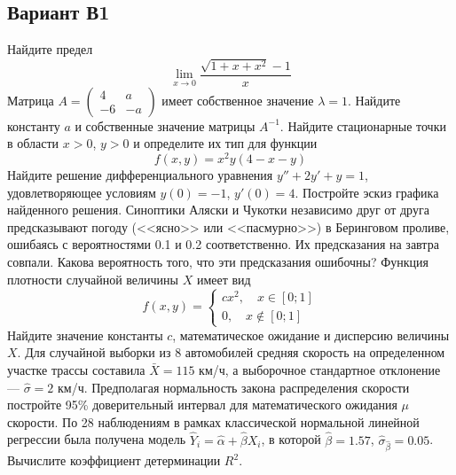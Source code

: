 \documentclass[addpoints, answers]{exam} %
\begin{document}
\subsection{Вариант В1}
\begin{questions}
\question  Найдите предел
\[
\lim_{x\to 0} \frac{\sqrt{1+x+x^2}-1}{x}
\]
\question Матрица $A=\left(\begin{array}{cc}
4 & a \\
-6 & -a
\end{array}\right)$ имеет собственное значение $\lambda=1$. Найдите константу $a$ и собственные значение матрицы $A^{-1}$.
\question Найдите стационарные точки в области $x>0$, $y>0$ и определите их тип для функции
\[
f(x,y)=x^2y(4-x-y)
\]
\question Найдите решение дифференциального уравнения $y''+2y'+y=1$, удовлетворяющее условиям $y(0)=-1$, $y'(0)=4$. Постройте эскиз графика найденного решения.
\question Синоптики Аляски и Чукотки независимо друг от друга предсказывают погоду (<<ясно>> или <<пасмурно>>) в Беринговом проливе, ошибаясь с вероятностями 0.1 и 0.2 соответственно. Их предсказания на завтра совпали. Какова вероятность того, что эти предсказания ошибочны?
\question Функция плотности случайной величины $X$ имеет вид
\[
f(x,y)=\left\{\begin{array}{c}
cx^2,\quad x\in[0;1] \\
0,\quad x\notin [0;1]
\end{array} \right.
\]
Найдите значение константы $c$, математическое ожидание и дисперсию величины $X$.
\question Для случайной выборки из 8 автомобилей средняя скорость на определенном участке трассы составила $\bar{X}=115$ км/ч, а выборочное стандартное отклонение --- $\hat{\sigma}=2$ км/ч. Предполагая нормальность закона распределения скорости постройте 95\% доверительный интервал для математического ожидания $\mu$ скорости.
\question По 28 наблюдениям в рамках классической нормальной линейной регрессии была получена модель $\hat{Y}_i=\hat{\alpha}+\hat{\beta}X_i$, в которой $\hat{\beta}=1.57$, $\hat{\sigma}_{\hat{\beta}}=0.05$. Вычислите коэффициент детерминации $R^2$.
\end{questions}
\end{document}
